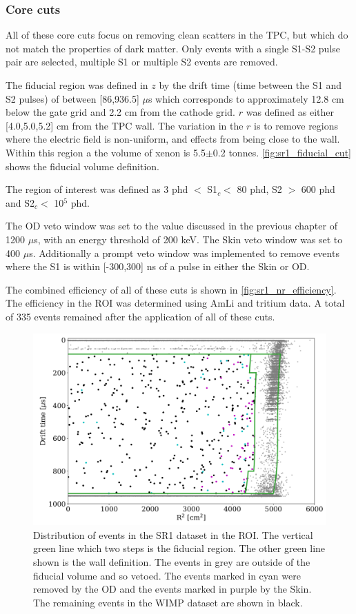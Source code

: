 \subsubsection{Core cuts}
All of these core cuts focus on removing clean scatters in the TPC, but which do not match the properties of dark matter.
Only events with a single S1-S2 pulse pair are selected, multiple S1 or multiple S2 events are removed.
\par
The fiducial region was defined in $z$ by the drift time (time between the S1 and S2 pulses) of between [86,936.5] $\mu$s which corresponds to approximately 12.8 cm below the gate grid and 2.2 cm from the cathode grid.
$r$ was defined as either [4.0,5.0,5.2] cm from the TPC wall. The variation in the $r$ is to remove regions where the electric field is non-uniform, and effects from being close to the wall.
Within this region a the volume of xenon is 5.5$\pm$0.2 tonnes.
\autoref{fig:sr1_fiducial_cut} shows the fiducial volume definition.
\par
The region of interest was defined as 3 phd $<$ S1$_c <$ 80 phd, S2 $>$ 600 phd and S2$_c <$ 10$^5$ phd.
\par
The OD veto window was set to the value discussed in the previous chapter of 1200 $\mu$s, with an energy threshold of 200 keV.
The Skin veto window was set to 400 $\mu$s.
Additionally a prompt veto window was implemented to remove events where the S1 is within [-300,300] ns of a pulse in either the Skin or OD.

\par
The combined efficiency of all of these cuts is shown in \autoref{fig:sr1_nr_efficiency}.
The efficiency in the ROI was determined using AmLi and tritium data.
A total of 335 events remained after the application of all of these cuts.

\begin{figure}
    \centering
    \includegraphics[width=15cm]{Figures/EFT/All_SR1_Plots/fid.png}
    \caption{Distribution of events in the SR1 dataset in the ROI.
    The vertical green line which two steps is the fiducial region.
    The other green line shown is the wall definition.
    The events in grey are outside of the fiducial volume and so vetoed. 
    The events marked in cyan were removed by the OD and the events marked in purple by the Skin.
    The remaining events in the WIMP dataset are shown in black.}
    \label{fig:sr1_fiducial_cut}
\end{figure}

